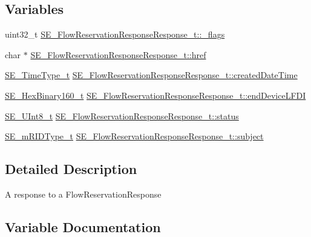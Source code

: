 \subsection*{Variables}
\begin{DoxyCompactItemize}
\item 
uint32\+\_\+t \hyperlink{group__FlowReservationResponseResponse_ga5af129d77c9a560502066c75c4fb7619}{S\+E\+\_\+\+Flow\+Reservation\+Response\+Response\+\_\+t\+::\+\_\+flags}
\item 
char $\ast$ \hyperlink{group__FlowReservationResponseResponse_gadab170c7a69f833a7b7db7247f400305}{S\+E\+\_\+\+Flow\+Reservation\+Response\+Response\+\_\+t\+::href}
\item 
\hyperlink{group__TimeType_ga6fba87a5b57829b4ff3f0e7638156682}{S\+E\+\_\+\+Time\+Type\+\_\+t} \hyperlink{group__FlowReservationResponseResponse_ga12b80e3dcd3a5d9220c7582193c97ae4}{S\+E\+\_\+\+Flow\+Reservation\+Response\+Response\+\_\+t\+::created\+Date\+Time}
\item 
\hyperlink{group__HexBinary160_ga92b92aa55555bdb75f3a59060f2c1632}{S\+E\+\_\+\+Hex\+Binary160\+\_\+t} \hyperlink{group__FlowReservationResponseResponse_gaf78fcf5a4bf4fb48da0fe100d4d37980}{S\+E\+\_\+\+Flow\+Reservation\+Response\+Response\+\_\+t\+::end\+Device\+L\+F\+DI}
\item 
\hyperlink{group__UInt8_gaf7c365a1acfe204e3a67c16ed44572f5}{S\+E\+\_\+\+U\+Int8\+\_\+t} \hyperlink{group__FlowReservationResponseResponse_ga5ecdbb63ff59d85cf982562cec5c3a5a}{S\+E\+\_\+\+Flow\+Reservation\+Response\+Response\+\_\+t\+::status}
\item 
\hyperlink{group__mRIDType_gac74622112f3a388a2851b2289963ba5e}{S\+E\+\_\+m\+R\+I\+D\+Type\+\_\+t} \hyperlink{group__FlowReservationResponseResponse_ga177ff4d3fb0d3e1ece98061c9bcfcb6c}{S\+E\+\_\+\+Flow\+Reservation\+Response\+Response\+\_\+t\+::subject}
\end{DoxyCompactItemize}


\subsection{Detailed Description}
A response to a Flow\+Reservation\+Response 

\subsection{Variable Documentation}
\mbox{\label{group__FlowReservationResponseResponse_ga5af129d77c9a560502066c75c4fb7619}} 
